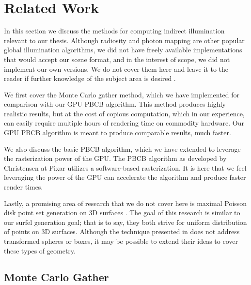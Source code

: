\chapter{Related Work}

In this section we discuss the methods for computing indirect illumination relevant to our thesis. Although radiosity and photon mapping are other popular global illumination algorithms, we did not have freely available implementations that would accept our scene format, and in the interest of scope, we did not implement our own versions. We do not cover them here and leave it to the reader if further knowledge of the subject area is desired \cite{bib:radiosity, bib:photon_maps}.

We first cover the Monte Carlo gather method, which we have implemented for comparison with our GPU PBCB algorithm. This method produces highly realistic results, but at the cost of copious computation, which in our experience, can easily require multiple hours of rendering time on commodity hardware. Our GPU PBCB algorithm is meant to produce comparable results, much faster.

We also discuss the basic PBCB algorithm, which we have extended to leverage the rasterization power of the GPU. The PBCB algorithm as developed by Christensen at Pixar \cite{bib:christensen2008} utilizes a software-based rasterization. It is here that we feel leveraging the power of the GPU can accelerate the algorithm and produce faster render times.

Lastly, a promising area of research that we do not cover here is maximal Poisson disk point set generation on 3D surfaces \cite{bib:poisson_set}. The goal of this research is similar to our surfel generation goal; that is to say, they both strive for uniform distribution of points on 3D surfaces. Although the technique presented in \cite{bib:poisson_set} does not address transformed spheres or boxes, it may be possible to extend their ideas to cover these types of geometry.

\section{Monte Carlo Gather}
\label{sec:monte_carlo_gather}

